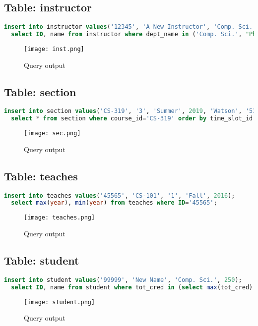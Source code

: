 \documentclass{article}
\begin{document}
\subsection{Table: instructor}
\begin{lstlisting}[language=sql]
  insert into instructor values('12345', 'A New Instructor', 'Comp. Sci.', 50000);
  select ID, name from instructor where dept_name in ('Comp. Sci.', "Physics");
\end{lstlisting}
\begin{figure}[!ht]
  \begin{center}
  \texttt{[image: inst.png]}
  \caption{Query output}
  \end{center}
\end{figure}

\newpage
\subsection{Table: section}
\begin{lstlisting}[language=sql]
  insert into section values('CS-319', '3', 'Summer', 2019, 'Watson', '514', 'A');
  select * from section where course_id='CS-319' order by time_slot_id asc
\end{lstlisting}
\begin{figure}[!ht]
  \begin{center}
  \texttt{[image: sec.png]}
  \caption{Query output}
  \end{center}
\end{figure}

\subsection{Table: teaches}
\begin{lstlisting}[language=sql]
  insert into teaches values('45565', 'CS-101', '1', 'Fall', 2016);
  select max(year), min(year) from teaches where ID='45565';
\end{lstlisting}
\begin{figure}[!ht]
  \begin{center}
  \texttt{[image: teaches.png]}
  \caption{Query output}
  \end{center}
\end{figure}

\subsection{Table: student}
\begin{lstlisting}[language=sql]
  insert into student values('99999', 'New Name', 'Comp. Sci.', 250);
  select ID, name from student where tot_cred in (select max(tot_cred) from student);
\end{lstlisting}
\begin{figure}[!ht]
  \begin{center}
  \texttt{[image: student.png]}
  \caption{Query output}
  \end{center}
\end{figure}
\end{document}
